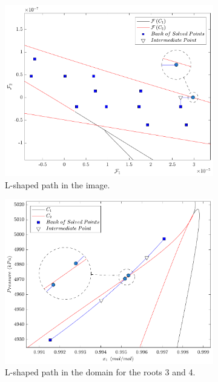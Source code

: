 \documentclass[journal=iecred,manuscript=article]{achemso}
\theoremstyle{definition}
\theoremstyle{remark}
\begin{document}
\begin{figure}
\centering
\begin{subfigure}{.48\textwidth}
  \centering
  \includegraphics[width=\linewidth]{caminho_L_degeneracao_imagem_new.pdf}
  \caption{L-shaped path in the image.}
  \label{fig:L_path_image}
\end{subfigure}\hfill
\begin{subfigure}{.48\textwidth}
  \centering
  \includegraphics[width=\linewidth]{caminhos_L_degeneracao_dominio_new.pdf}
  \caption{L-shaped path in the domain for the roots 3 and 4.}
  \label{fig:L_path_domain}
\end{subfigure}
\caption{}
\label{fig:L_path_domain_image}
\end{figure}
\end{document}
